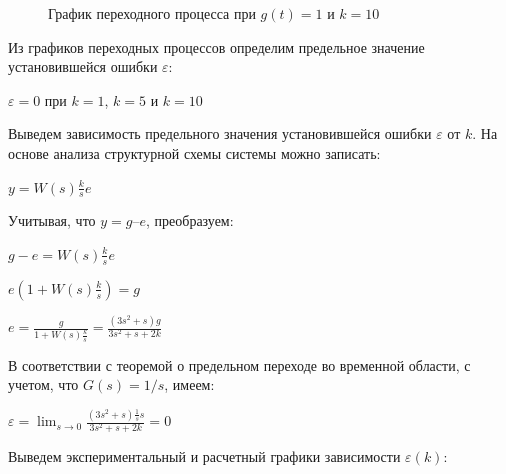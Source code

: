 \documentclass[a4paper, 11pt]{article}
\begin{document}
\begin{figure}[h!]
\caption{График переходного процесса при $g(t) = 1$ и $k = 10$}
\label{ris:image}
\end{figure}

\newpage
\par 
Из графиков переходных процессов определим предельное значение установившейся ошибки $\varepsilon$:
\par 
$\varepsilon = 0$ при $k = 1$, $k = 5$ и $k = 10$
\par 
Выведем зависимость  предельного значения установившейся ошибки $\varepsilon$ от $k$. На основе анализа структурной схемы системы можно записать:
\par 
$\displaystyle y=W(s)\frac{k}{s}e$
\par 
Учитывая, что $y = g – e$, преобразуем:
\par 
$\displaystyle g-e=W(s)\frac{k}{s}e$
\par 
$\displaystyle e(1+W(s)\frac{k}{s})=g$
\par 
$e=\displaystyle\frac{g}{1+W(s)\frac{k}{s}}=\frac{(3s^2+s)g}{3s^2+s+2k}$
\par 
В соответствии с теоремой о предельном переходе во временной области, с учетом, что $G(s) = 1/s$, имеем: 
\par 
$\varepsilon=\lim_{s\to 0}\displaystyle\frac{(3s^2+s)\frac{1}{s}s}{3s^2+s+2k}=0$
\par 
Выведем экспериментальный и расчетный графики зависимости $\varepsilon(k)$:
\end{document}
